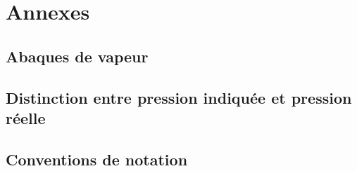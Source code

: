 \appendix
\chapter*{Annexes}\thispagestyle{empty}
\clearpage

	\section{Abaques de vapeur}\thispagestyle{empty}
	[\vspace{-0.5cm}]

		
	\restoregeometry
	\clearpage\restoredefaultheadoffset

	\begin{spacing}{1.06}
	\pagestyle{empty}\fancyhead{}\fancyhf{}\renewcommand{\headrulewidth}{0pt}\renewcommand{\footrulewidth}{0pt} %
	
	[\vspace{-0.5cm}]
	\pagestyle{fancy}
	\end{spacing}%
	\restoregeometry%

\widecenteredpagegeometry
	\section[Pression indiquée et pression réelle]{Distinction entre pression indiquée et pression réelle}
	\label{ch_annexe_pression}

		
	
	\clearpage	
	\section{Conventions de notation}
		
				


